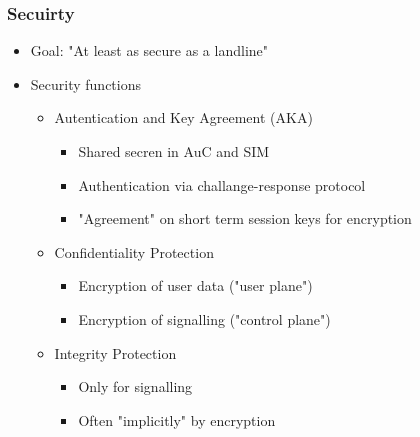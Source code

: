 \subsubsection{Secuirty}
\begin{itemize}
  \item Goal: "At least as secure as a landline"
  \item Security functions
    \begin{itemize}
      \item Autentication and Key Agreement (AKA)
        \begin{itemize}
          \item Shared secren in AuC and SIM
          \item Authentication via challange-response protocol
          \item "Agreement" on short term session keys for encryption
        \end{itemize}
      \item Confidentiality Protection
        \begin{itemize}
          \item Encryption of user data ("user plane")
          \item Encryption of signalling ("control plane")
        \end{itemize}
      \item Integrity Protection
        \begin{itemize}
          \item Only for signalling
          \item Often "implicitly" by encryption
        \end{itemize}
    \end{itemize}
\end{itemize}

